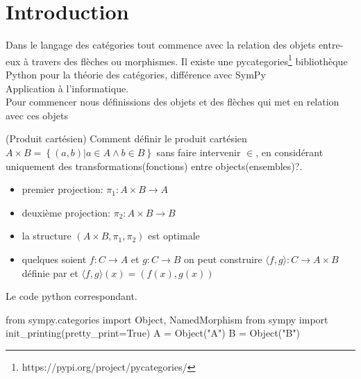\section{Introduction}
Dans le langage des catégories tout commence avec la relation des objets entre-eux à travers des flèches ou morphismes. Il existe une pycategories\footnote{https://pypi.org/project/pycategories/} bibliothèque Python  pour la théorie des catégories, différence avec SymPy
\\

Application à l'informatique.
\\

Pour commencer nous définissions des objets et des flèches qui met en relation avec ces objets 

\begin{example}(Produit cartésien)
Comment définir le produit cartésien $A \times B = \left\lbrace \left( a, b\right)  \vert a \in A \wedge b \in B\right\rbrace$ sans faire intervenir $\in$, en considérant uniquement des transformations(fonctions) entre objects(ensembles)?.
\begin{itemize}
 \item premier projection: $\pi_{1}: A \times B \rightarrow A$
 \item deuxième projection: $\pi_{2}: A \times B \rightarrow B$
 \item la structure $\left(A \times B,\pi_{1},\pi_{2}\right) $ est optimale
 \item quelques soient $f: C \rightarrow A$ et $g: C \rightarrow B$ on peut construire 
 $\langle f, g \rangle: C \rightarrow A \times B$ définie par et $\langle f, g \rangle\left(x\right)=\left(f\left(x\right),g\left(x\right)\right)$
 \\
 
\end{itemize}
Le code python correspondant.
\begin{python}
from sympy.categories import Object, NamedMorphism
from sympy import init_printing(pretty_print=True)
A = Object("A")
B = Object("B")
\end{python}
\end{example}
